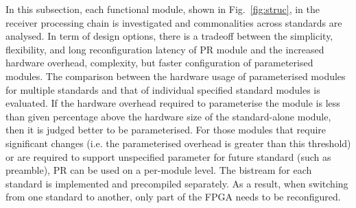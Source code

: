 In this subsection, each functional module, shown in Fig.~\ref{fig:struc}, in the receiver processing chain is investigated and commonalities across standards are analysed.
In term of design options, there is a tradeoff between the simplicity, flexibility, and long reconfiguration latency of PR module and the increased hardware overhead, complexity, but faster configuration of parameterised modules.
The comparison between the hardware usage of parameterised modules for multiple standards and that of individual specified standard modules is evaluated.
If the hardware overhead required to parameterise the module is less than given percentage above the hardware size of the standard-alone module, then it is judged better to be parameterised.  
For those modules that require significant changes (i.e. the parameterised overhead is greater than this threshold) or are required to support unspecified parameter for future standard (such as preamble), PR can be used on a per-module level. 
The bistream for each standard is implemented and precompiled separately.
As a result, when switching from one standard to another, only part of the FPGA needs to be reconfigured.

